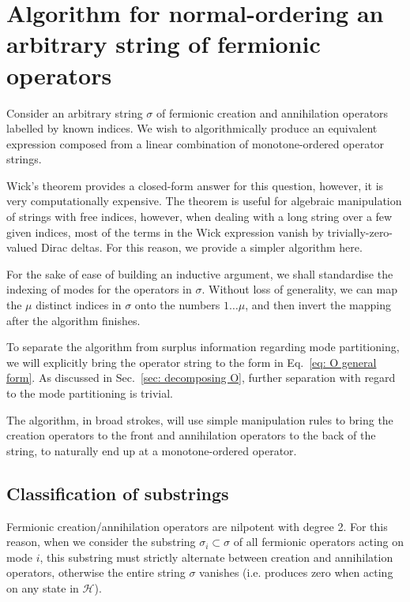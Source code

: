 \documentclass[12pt]{article}
\begin{document}
	\section{Algorithm for normal-ordering an arbitrary string of fermionic operators}
	
	Consider an arbitrary string $\sigma$ of fermionic creation and annihilation operators labelled by known indices. We wish to algorithmically produce an equivalent expression composed from a linear combination of monotone-ordered operator strings.
	
	Wick's theorem provides a closed-form answer for this question, however, it is very computationally expensive. The theorem is useful for algebraic manipulation of strings with free indices, however, when dealing with a long string over a few given indices, most of the terms in the Wick expression vanish by trivially-zero-valued Dirac deltas. For this reason, we provide a simpler algorithm here.
	
	For the sake of ease of building an inductive argument, we shall standardise the indexing of modes for the operators in $\sigma$. Without loss of generality, we can map the $\mu$ distinct indices in $\sigma$ onto the numbers $1 \dots \mu$, and then invert the mapping after the algorithm finishes.
	
	To separate the algorithm from surplus information regarding mode partitioning, we will explicitly bring the operator string to the form in Eq.~\eqref{eq: O general form}. As discussed in Sec.~\ref{sec: decomposing O}, further separation with regard to the mode partitioning is trivial.
	
	The algorithm, in broad strokes, will use simple manipulation rules to bring the creation operators to the front and annihilation operators to the back of the string, to naturally end up at a monotone-ordered operator.
	
	\subsection{Classification of substrings}
	
	Fermionic creation/annihilation operators are nilpotent with degree 2. For this reason, when we consider the substring $\sigma_i \subset \sigma$ of all fermionic operators acting on mode $i$, this substring must strictly alternate between creation and annihilation operators, otherwise the entire string $\sigma$ vanishes (i.e. produces zero when acting on any state in $\mathcal{H}$).
	
\end{document}
